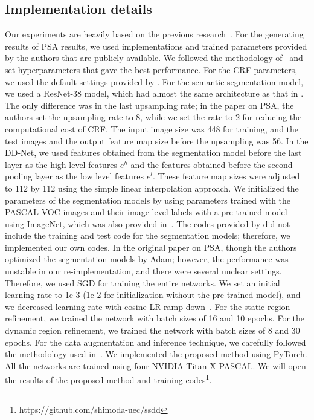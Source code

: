 \documentclass[10pt,twocolumn,letterpaper]{article}
\begin{document}
\subsection{Implementation details}
Our experiments are heavily based on the previous research~\cite{psa}.
For the generating results of PSA results, we used implementations and trained parameters
provided by the authors that are publicly available.
We followed the methodology of~\cite{psa} and set hyperparameters
that gave the best performance.
For the CRF parameters, we used the default settings provided by \cite{kra11}.
For the semantic segmentation model, we used a ResNet-38 model, which had almost the same architecture as that in \cite{psa}.
The only difference was in the last upsampling rate; in the paper on PSA, the authors set the upsampling rate to 8, while we set the rate to 2 for reducing the computational cost of CRF.
The input image size was 448 for training, and the test images and the output feature map size before the upsampling was 56.
In the DD-Net, we used features obtained from the segmentation model before the last layer as the high-level features $e^{h}$ and the features obtained before the second pooling layer 
as the low level features $e^{l}$. 
These feature map sizes were adjusted to 112 by 112 using the simple linear interpolation approach.
We initialized the parameters of the segmentation models by using parameters trained with the PASCAL VOC images and their image-level labels with a pre-trained model using ImageNet, which was also provided in~\cite{psa}.
The codes provided by \cite{psa} did not include the training and test code for the segmentation models; therefore, we implemented our own codes.
In the original paper on PSA, though the authors optimized the segmentation models by Adam; however,
the performance was unstable in our re-implementation, and there were several unclear settings. 
Therefore, we used SGD for training the entire networks.
We set an initial learning rate to 1e-3 (1e-2 for initialization without the pre-trained model), and
we decreased learning rate with cosine LR ramp down~\cite{cosign_warm}.
For the static region refinement, we trained the network with batch sizes of 16 and 10 epochs.
For the dynamic region refinement, we trained the network with batch sizes of 8 and 30 epochs.
For the data augmentation and inference technique, we carefully followed the methodology used in~\cite{psa}.
We implemented the proposed method using PyTorch.
All the networks are trained using four NVIDIA Titan X PASCAL.
We will open the results of the proposed method and training codes\footnote{https://github.com/shimoda-uec/ssdd}.
\end{document}
